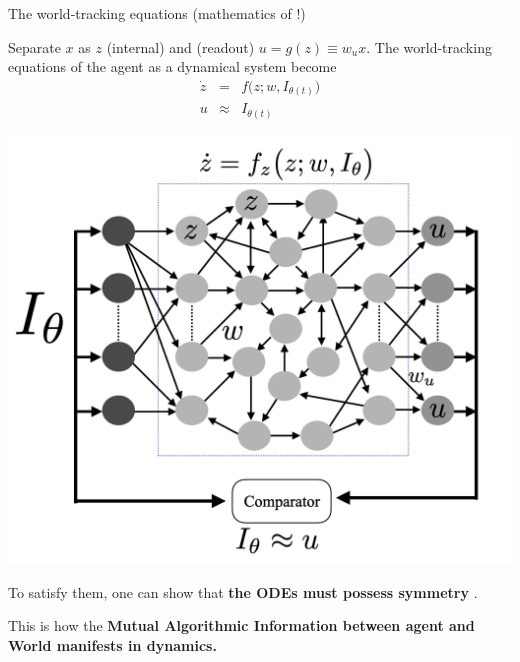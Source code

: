 \begin{frame}{The world-tracking equations (mathematics of \SEP!)}

\begin{minipage}{0.5\linewidth}
    Separate $x$ as $z$ (internal) and (readout) $u=g(z) \equiv w_u x$. The world-tracking equations of the agent as a dynamical system become
    \begin{eqnarray*}\label{eq:WTNE} 
        \dot z &=& f\big(z; w, I_{\theta(t)}\big) \nonumber \\
        u  &\approx &I_{\theta (t)}
    \end{eqnarray*}
\end{minipage}%
\hfill
\begin{minipage}{0.45\linewidth}
    \centering
        \includegraphics[width=0.9\linewidth]{wt.png}

\end{minipage}

\vfill
To satisfy them, one can show that \textbf{the ODEs must possess symmetry} \cite{ruffiniStructuredDynamicsAlgorithmic2023}. 
\vfill

This is how the \textbf{Mutual Algorithmic Information between agent and World manifests in dynamics.}
\end{frame}

 




